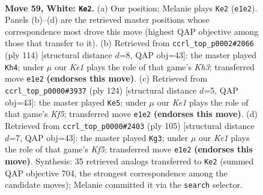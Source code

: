 \documentclass[11pt]{article}
\begin{document}
\clearpage

\begin{figure}[p]\centering
\begin{subfigure}{0.46\textwidth}\centering
\resizebox{\linewidth}{!}{%
\newchessgame
\chessboard[
  setfen={6k1/8/8/1P6/R3p1r1/8/8/4K3 w - - 3 59},
  showmover=false,
  pgfstyle=straightmove, color=movearrow, markmove={e1-e2}
]}
\caption{}
\end{subfigure}\hfill
\begin{subfigure}{0.46\textwidth}\centering
\resizebox{\linewidth}{!}{%
\newchessgame
\chessboard[
  setfen={8/R3p1r1/4P3/8/4k3/7K/8/8 w - - 19 58},
  showmover=false,
  pgfstyle=straightmove, color=movearrow, markmove={h3-h4}
]}
\caption{}
\end{subfigure}
\\[4pt]
\begin{subfigure}{0.46\textwidth}\centering
\resizebox{\linewidth}{!}{%
\newchessgame
\chessboard[
  setfen={R7/4k3/8/5K2/p7/5P2/r7/8 w - - 5 63},
  showmover=false,
  pgfstyle=straightmove, color=movearrow, markmove={f5-e5}
]}
\caption{}
\end{subfigure}\hfill
\begin{subfigure}{0.46\textwidth}\centering
\resizebox{\linewidth}{!}{%
\newchessgame
\chessboard[
  setfen={R7/8/P7/8/2P2k2/8/r7/7K b - - 2 53},
  showmover=false,
  pgfstyle=straightmove, color=movearrow, markmove={f4-g3}
]}
\caption{}
\end{subfigure}
\caption{\textbf{Move 59, White: \texttt{Ke2}.} (a) Our position; Melanie plays \texttt{Ke2} (\texttt{e1e2}). Panels (b)--(d) are the retrieved master positions whose correspondence most drove this move (highest QAP objective among those that transfer to it). (b) Retrieved from \texttt{ccrl\_top\_p0002\#2066} (ply 114) [structural distance $d$=8, QAP obj=43]: the master played \texttt{Kh4}; under $\mu$ our \emph{Ke1} plays the role of that game's \emph{Kh3}; transferred move \texttt{e1e2} \textbf{(endorses this move)}. (c) Retrieved from \texttt{ccrl\_top\_p0000\#3937} (ply 124) [structural distance $d$=5, QAP obj=43]: the master played \texttt{Ke5}; under $\mu$ our \emph{Ke1} plays the role of that game's \emph{Kf5}; transferred move \texttt{e1e2} \textbf{(endorses this move)}. (d) Retrieved from \texttt{ccrl\_top\_p0000\#2403} (ply 105) [structural distance $d$=7, QAP obj=43]: the master played \texttt{Kg3}; under $\mu$ our \emph{Ke1} plays the role of that game's \emph{Kf5}; transferred move \texttt{e1e2} \textbf{(endorses this move)}. Synthesis: 35 retrieved analogs transferred to \texttt{Ke2} (summed QAP objective 704, the strongest correspondence among the candidate moves); Melanie committed it via the \texttt{search} selector.}
\label{fig:thought-m116}
\end{figure}
\end{document}
